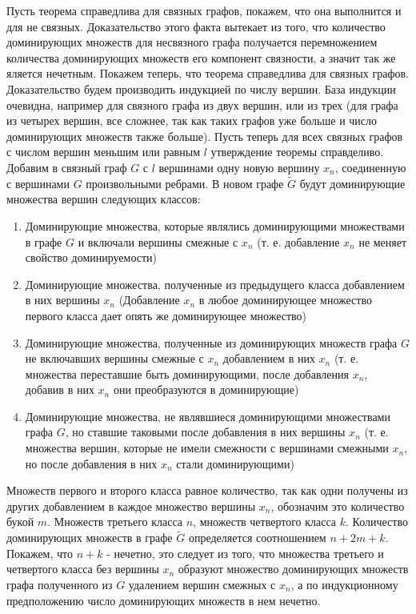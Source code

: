 \documentclass[a4paper,12pt]{article}
\begin{document}
\begin{Solution}
Пусть теорема справедлива для связных графов, покажем, что она выполнится и для не связных. Доказательство этого факта вытекает из того, что количество доминирующих множеств для несвязного графа получается перемножением количества доминирующих множеств его компонент связности, а значит так же яляется нечетным. Покажем теперь, что теорема справедлива для связных графов. Доказательство будем производить индукцией по числу вершин. База индукции очевидна, например для связного графа из двух вершин, или из трех (для графа из четырех вершин, все сложнее, так как таких графов уже больше и число доминирующих множеств также больше). Пусть теперь для всех связных графов с числом вершин меньшим или равным $l$ утверждение теоремы справделиво. Добавим в связный граф $G$ с $l$ вершинами одну новую вершину $x_n$, соединенную с вершинами $G$ произвольными ребрами. В новом графе $\tilde G$ будут доминирующие множества вершин следующих классов:
\begin{enumerate}
\item Доминирующие множества, которые являлись доминирующими множествами в графе $G$ и включали вершины смежные с $x_n$ (т. е. добавление $x_n$ не меняет свойство доминируемости)

\item Доминирующие множества, полученные из предыдущего класса добавлением в них вершины $x_n$ (Добавление $x_n$ в любое доминирующее множество первого класса дает опять же доминирующее множество)

\item Доминирующие множества, полученные из доминирующих множеств графа $G$ не включавших вершины смежные с $x_n$ добавлением в них $x_n$ (т. е. множества переставшие быть доминирующими, после добавления $x_n$, добавив в них $x_n$ они преобразуются в доминирующие)

\item Доминирующие множества, не являвшиеся доминирующими множествами графа $G$, но ставшие таковыми после добавления в них вершины $x_n$ (т. е. множества вершин, которые не имели смежности с вершинами смежными $x_n$, но после добавления в них $x_n$ стали доминирующими)
\end{enumerate}
Множеств первого и второго класса равное количество, так как одни получены из других добавлением в каждое множество вершины $x_n$, обозначим это количество букой $m$. Множеств третьего класса $n$, множеств четвертого класса $k$. Количество доминирующих множеств в графе $\tilde G$ определяется соотношением $n + 2m + k$. Покажем, что $n+k$ - нечетно, это следует из того, что множества третьего и четвертого класса без вершины $x_n$ образуют множество доминирующих множеств графа полученного из $G$ удалением вершин смежных с $x_n$, а по индукционному предположению число доминирующих множеств в нем нечетно.
\end{Solution}
\end{document}
